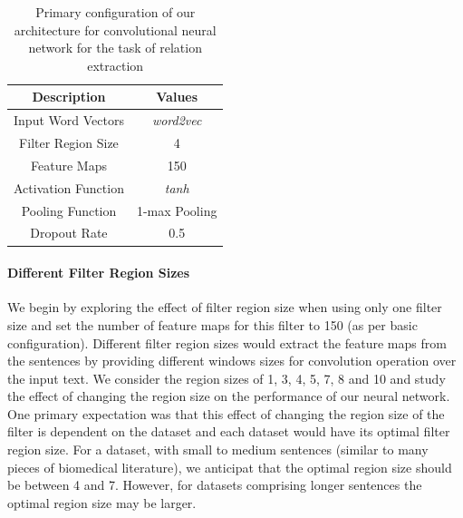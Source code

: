 \begin{table}[h]
    \centering
    \caption{Primary configuration of our architecture for convolutional neural network for the task of relation extraction}
    \begin{tabular}{c  c}
         \textbf{Description}   &   \textbf{Values} \\
         \hline
         Input Word Vectors     &   {\it word2vec}  \\
         Filter Region Size     &   4               \\
         Feature Maps           &   150             \\
         Activation Function    &   {\it tanh}      \\
         Pooling Function       &   1-max Pooling   \\
         Dropout Rate           &   0.5             \\
    \end{tabular}
    \label{table:basic-configuration}
\end{table}

\paragraph{Different Filter Region Sizes}
We begin by exploring the effect of filter region size when using only one filter size and set the number of feature maps for this filter to 150 (as per basic configuration). Different filter region sizes would extract the feature maps from the sentences by providing different windows sizes for convolution operation over the input text. We consider the region sizes of 1, 3, 4, 5, 7, 8 and 10 and study the effect of changing the region size on the performance of our neural network. One primary expectation was that this effect of changing the region size of the filter is dependent on the dataset and each dataset would have its optimal filter region size. For a dataset, with small to medium sentences (similar to many pieces of biomedical literature), we anticipat that the optimal region size should be between 4 and 7. However, for datasets comprising longer sentences the optimal region size may be larger.   


